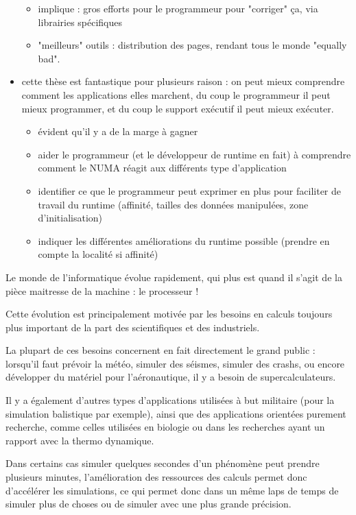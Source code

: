 \begin{itemize}
\begin{itemize}
    \item implique : gros efforts pour le programmeur pour "corriger" ça, via librairies spécifiques
    \item "meilleurs" outils : distribution des pages, rendant tous le monde "equally bad".
  \end{itemize}
  \item cette thèse est fantastique pour plusieurs raison : on peut mieux comprendre comment les applications elles marchent, du coup le programmeur il peut mieux programmer, et du coup le support exécutif il peut mieux exécuter.
  \begin{itemize}
    \item évident qu'il y a de la marge à gagner
    \item aider le programmeur (et le développeur de runtime en fait) à comprendre comment le NUMA réagit aux différents type d'application
    \item identifier ce que le programmeur peut exprimer en plus pour faciliter de travail du runtime (affinité, tailles des données manipulées, zone d'initialisation)
    \item indiquer les différentes améliorations du runtime possible (prendre en compte la localité si affinité)
  \end{itemize}
\end{itemize}


Le monde de l'informatique évolue rapidement, qui plus est quand il s'agit de la pièce maitresse de la machine : le processeur !

Cette évolution est principalement motivée par les besoins en calculs toujours plus important de la part des scientifiques et des industriels.

La plupart de ces besoins concernent en fait directement le grand public : lorsqu'il faut prévoir la météo, simuler des séismes, simuler des crashs, ou encore développer du matériel pour l'aéronautique, il y a besoin de supercalculateurs.

Il y a également d'autres types d'applications utilisées à but militaire (pour la simulation balistique par exemple), ainsi que des applications orientées purement recherche, comme celles utilisées en biologie ou dans les recherches ayant un rapport avec la thermo dynamique.

Dans certains cas simuler quelques secondes d'un phénomène peut prendre plusieurs minutes, l'amélioration des ressources des calculs permet donc d'accélérer les simulations, ce qui permet donc dans un même laps de temps de simuler plus de choses ou de simuler avec une plus grande précision.

